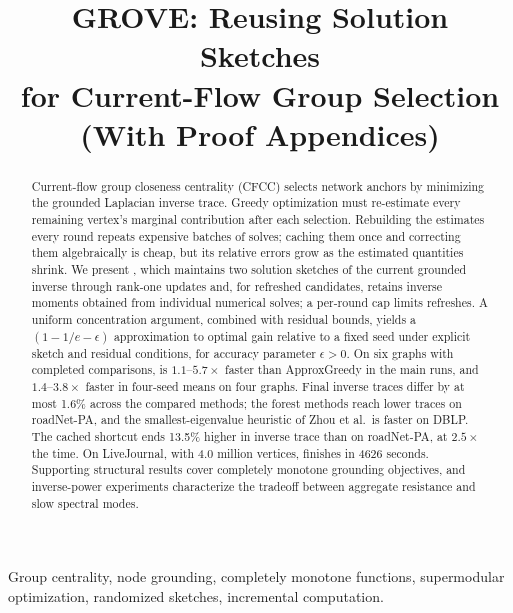 \title{GROVE: Reusing Solution Sketches\\for Current-Flow Group Selection\iffull\\{\large(With Proof Appendices)}\fi}
\author{
}
\maketitle
\begin{abstract}
Current-flow group closeness centrality (CFCC) selects network anchors
by minimizing the grounded Laplacian inverse trace. Greedy optimization
must re-estimate every remaining vertex's marginal contribution after
each selection. Rebuilding the estimates every round repeats expensive
batches of solves; caching them once and correcting them algebraically
is cheap, but its relative errors grow as the estimated quantities
shrink. We present \alg{}, which maintains two solution sketches of
the current grounded inverse through rank-one updates and, for
refreshed candidates, retains inverse moments obtained from individual
numerical solves; a per-round cap limits refreshes.
A uniform concentration argument, combined with residual bounds,
yields a $(1-1/e-\epsilon)$ approximation to optimal gain relative
to a fixed seed under explicit sketch and residual conditions, for
accuracy parameter $\epsilon>0$. On six graphs with completed comparisons, \alg{}
is $1.1$--$5.7\times$ faster than ApproxGreedy in the main runs, and
$1.4$--$3.8\times$ faster in four-seed means on four graphs. Final
inverse traces differ by at most 1.6\% across the compared methods;
the forest methods reach lower traces on roadNet-PA, and the
smallest-eigenvalue heuristic of Zhou et al.\ is faster on DBLP.
The cached shortcut ends 13.5\% higher in inverse trace than \alg{}
on roadNet-PA, at $2.5\times$ the time.
On LiveJournal, with 4.0 million vertices, \alg{} finishes in 4626
seconds. Supporting structural results cover completely monotone
grounding objectives, and inverse-power experiments characterize the
tradeoff between aggregate resistance and slow spectral modes.
\end{abstract}
\begin{IEEEkeywords}
Group centrality, node grounding, completely monotone functions,
supermodular optimization, randomized sketches, incremental computation.
\end{IEEEkeywords}

